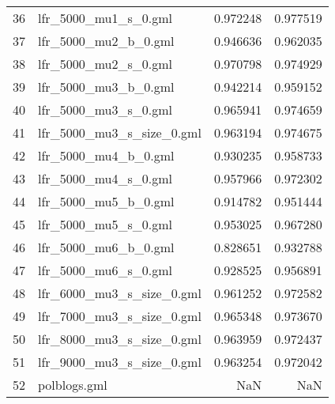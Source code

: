 \begin{tabular}{llrr}
36 &        lfr\_5000\_mu1\_s\_0.gml &                      0.972248 &                    0.977519 \\
37 &        lfr\_5000\_mu2\_b\_0.gml &                      0.946636 &                    0.962035 \\
38 &        lfr\_5000\_mu2\_s\_0.gml &                      0.970798 &                    0.974929 \\
39 &        lfr\_5000\_mu3\_b\_0.gml &                      0.942214 &                    0.959152 \\
40 &        lfr\_5000\_mu3\_s\_0.gml &                      0.965941 &                    0.974659 \\
41 &   lfr\_5000\_mu3\_s\_size\_0.gml &                      0.963194 &                    0.974675 \\
42 &        lfr\_5000\_mu4\_b\_0.gml &                      0.930235 &                    0.958733 \\
43 &        lfr\_5000\_mu4\_s\_0.gml &                      0.957966 &                    0.972302 \\
44 &        lfr\_5000\_mu5\_b\_0.gml &                      0.914782 &                    0.951444 \\
45 &        lfr\_5000\_mu5\_s\_0.gml &                      0.953025 &                    0.967280 \\
46 &        lfr\_5000\_mu6\_b\_0.gml &                      0.828651 &                    0.932788 \\
47 &        lfr\_5000\_mu6\_s\_0.gml &                      0.928525 &                    0.956891 \\
48 &   lfr\_6000\_mu3\_s\_size\_0.gml &                      0.961252 &                    0.972582 \\
49 &   lfr\_7000\_mu3\_s\_size\_0.gml &                      0.965348 &                    0.973670 \\
50 &   lfr\_8000\_mu3\_s\_size\_0.gml &                      0.963959 &                    0.972437 \\
51 &   lfr\_9000\_mu3\_s\_size\_0.gml &                      0.963254 &                    0.972042 \\
52 &                polblogs.gml &                           NaN &                         NaN \\
\bottomrule
\end{tabular}
